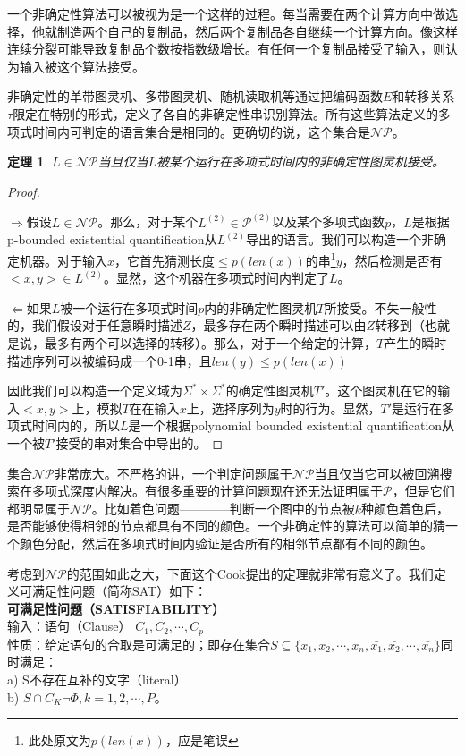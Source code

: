 \documentclass[twocolumn]{article}
\newtheorem{theorem}{\hspace{2em}定理}
\theoremstyle{nonumberplain}%
\newtheorem{proof}{\hspace{2em}证明}
\begin{document}
    一个非确定性算法可以被视为是一个这样的过程。每当需要在两个计算方向中做选择，他就制造两个自己的复制品，然后两个复制品各自继续一个计算方向。像这样连续分裂可能导致复制品个数按指数级增长。有任何一个复制品接受了输入，则认为输入被这个算法接受。

    非确定性的单带图灵机、多带图灵机、随机读取机等通过把编码函数$E$和转移关系$\tau$限定在特别的形式，定义了各自的非确定性串识别算法。所有这些算法定义的多项式时间内可判定的语言集合是相同的。更确切的说，这个集合是$\mathcal{NP}$。

    \begin{theorem}
      $L\in \mathcal{NP}$当且仅当$L$被某个运行在多项式时间内的非确定性图灵机接受。
    \end{theorem}

    \begin{proof}
        　

        $\Rightarrow$假设$L\in\mathcal{NP}$。那么，对于某个$L^{(2)}\in\mathcal{P}^{(2)}$以及某个多项式函数$p$，$L$是根据p-bounded existential quantification从$L^{(2)}$导出的语言。我们可以构造一个非确定机器。对于输入$x$，它首先猜测长度$\leq p(len(x))$的串\footnote{此处原文为$p(len(x))$，应是笔误}$y$，然后检测是否有$<x,y>\in L^{(2)}$。显然，这个机器在多项式时间内判定了$L$。

        $\Leftarrow$如果$L$被一个运行在多项式时间$p$内的非确定性图灵机$T$所接受。不失一般性的，我们假设对于任意瞬时描述$Z$，最多存在两个瞬时描述可以由$Z$转移到（也就是说，最多有两个可以选择的转移）。那么，对于一个给定的计算，$T$产生的瞬时描述序列可以被编码成一个0-1串，且$len(y)\leq p(len(x))$

        因此我们可以构造一个定义域为$\Sigma^*\times\Sigma^*$的确定性图灵机$T'$。这个图灵机在它的输入$<x,y>$上，模拟$T$在在输入$x$上，选择序列为$y$时的行为。显然，$T'$是运行在多项式时间内的，所以$L$是一个根据polynomial bounded existential quantification从一个被$T'$接受的串对集合中导出的。
    \end{proof}

    集合$\mathcal{NP}$非常庞大。不严格的讲，一个判定问题属于$\mathcal{NP}$当且仅当它可以被回溯搜索在多项式深度内解决。有很多重要的计算问题现在还无法证明属于$\mathcal{P}$，但是它们都明显属于$\mathcal{NP}$。比如着色问题————判断一个图中的节点被$k$种颜色着色后，是否能够使得相邻的节点都具有不同的颜色。一个非确定性的算法可以简单的猜一个颜色分配，然后在多项式时间内验证是否所有的相邻节点都有不同的颜色。

    考虑到$\mathcal{NP}$的范围如此之大，下面这个Cook提出的定理就非常有意义了。我们定义可满足性问题（简称SAT）如下：\\
    {\bf 可满足性问题（SATISFIABILITY）}\\
    输入：语句（Clause） $C_1,C_2,\cdots,C_p$\\
    性质：给定语句的合取是可满足的；即存在集合$S\subseteq\{x_1,x_2,\cdots,x_n,\bar{x_1},\bar{x_2},\cdots,\bar{x_n}\}$同时满足：\\
    \indent a) S不存在互补的文字（literal）\\
    \indent b) $S\cap C_K\neg\Phi,k=1,2,\cdots,P$。
\end{document}
